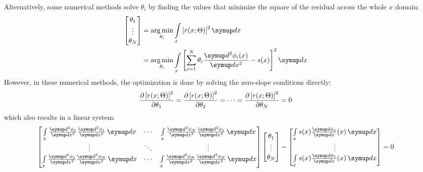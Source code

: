 Alternatively, some numerical methods solve $\theta_i$ by finding the values that minimize the square of the residual across the whole $x$ domain:
\begin{equation}\label{eq:least-square-fem}
    \begin{aligned}
        \begin{bmatrix}
            \theta_1 \\ \vdots \\ \theta_N
        \end{bmatrix}
        & =
        \operatorname*{arg\,min}\limits_{\theta_i}
        \int\limits_{x}\left[r(x; \Theta)\right]^2\diff x \\
        & =
        \operatorname*{arg\,min}\limits_{\theta_i}
        \int\limits_{x}\left[\sum\limits_{i=1}^{N}\theta_i \frac{\diff^2 \phi_i(x)}{\diff x^2} - s(x)\right]^2\diff x
    \end{aligned}
\end{equation}
However, in these numerical methods, the optimization is done by solving the zero-slope conditions directly:
\begin{equation}
    \frac{\partial \left[r(x; \Theta)\right]^2}{\partial \theta_1} = 
    \frac{\partial \left[r(x; \Theta)\right]^2}{\partial \theta_2} = 
    \cdots =
    \frac{\partial \left[r(x; \Theta)\right]^2}{\partial \theta_N} = 
    0
\end{equation}
which also results in a linear system:
\begin{equation}\label{eq:spetral-least-equare}
    \begin{bmatrix}
        \int\limits_{x}
        \frac{\diff^2 \phi_1}{\diff x^2}
        \frac{\diff^2 \phi_1}{\diff x^2}
        \diff x
        &
        \cdots
        &
        \int\limits_{x}
        \frac{\diff^2 \phi_N}{\diff x^2}
        \frac{\diff^2 \phi_1}{\diff x^2}
        \diff x \\
        \vdots & \ddots & \vdots \\
        \int\limits_{x}
        \frac{\diff^2 \phi_1}{\diff x^2}
        \frac{\diff^2 \phi_N}{\diff x^2}
        \diff x
        &
        \cdots
        &
        \int\limits_{x}
        \frac{\diff^2 \phi_N}{\diff x^2}
        \frac{\diff^2 \phi_N}{\diff x^2}
        \diff x \\
    \end{bmatrix}
    \begin{bmatrix}
        \theta_1 \\ \vdots \\ \theta_N
    \end{bmatrix}
    - 
    \begin{bmatrix}
        \int\limits_{x}s(x)\frac{\diff \phi_1}{\diff x}(x) \diff x \\
        \vdots \\
        \int\limits_{x}s(x)\frac{\diff \phi_1}{\diff x}(x) \diff x
    \end{bmatrix}
    = 0
\end{equation}
